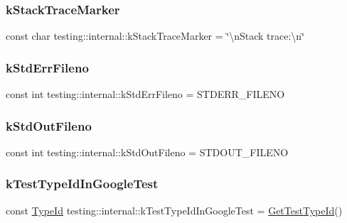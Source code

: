 \subsubsection{\texorpdfstring{kStackTraceMarker}{kStackTraceMarker}}
{\footnotesize\ttfamily const char testing\+::internal\+::k\+Stack\+Trace\+Marker = \char`\"{}\textbackslash{}n\+Stack trace\+:\textbackslash{}n\char`\"{}}

\mbox{\label{namespacetesting_1_1internal_a747eccfdbdee3ff8af3bedc476a57c85}} 
\subsubsection{\texorpdfstring{kStdErrFileno}{kStdErrFileno}}
{\footnotesize\ttfamily const int testing\+::internal\+::k\+Std\+Err\+Fileno = S\+T\+D\+E\+R\+R\+\_\+\+F\+I\+L\+E\+NO}

\mbox{\label{namespacetesting_1_1internal_a24f0a3d50cac54a9132f4828ec9b96d9}} 
\subsubsection{\texorpdfstring{kStdOutFileno}{kStdOutFileno}}
{\footnotesize\ttfamily const int testing\+::internal\+::k\+Std\+Out\+Fileno = S\+T\+D\+O\+U\+T\+\_\+\+F\+I\+L\+E\+NO}

\mbox{\label{namespacetesting_1_1internal_acac7993efabbd9dd62c1e9c7d143a72f}} 
\subsubsection{\texorpdfstring{kTestTypeIdInGoogleTest}{kTestTypeIdInGoogleTest}}
{\footnotesize\ttfamily const \mbox{\hyperlink{namespacetesting_1_1internal_a38c435cbab5f8b784e2e7f3356cab242}{Type\+Id}} testing\+::internal\+::k\+Test\+Type\+Id\+In\+Google\+Test = \mbox{\hyperlink{namespacetesting_1_1internal_ad0d66d56ead224263cd100c1d6bfc562}{Get\+Test\+Type\+Id}}()}

